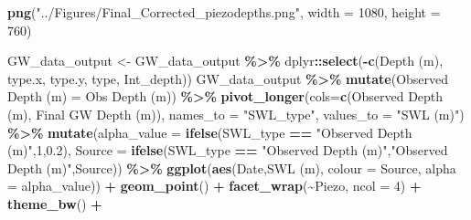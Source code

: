 \documentclass[
]{article}
\newenvironment{Shaded}{\begin{snugshade}}{\end{snugshade}}
\newcommand{\AttributeTok}[1]{\textcolor[rgb]{0.13,0.29,0.53}{#1}}
\newcommand{\DecValTok}[1]{\textcolor[rgb]{0.00,0.00,0.81}{#1}}
\newcommand{\FloatTok}[1]{\textcolor[rgb]{0.00,0.00,0.81}{#1}}
\newcommand{\FunctionTok}[1]{\textcolor[rgb]{0.13,0.29,0.53}{\textbf{#1}}}
\newcommand{\NormalTok}[1]{#1}
\newcommand{\OtherTok}[1]{\textcolor[rgb]{0.56,0.35,0.01}{#1}}
\newcommand{\SpecialCharTok}[1]{\textcolor[rgb]{0.81,0.36,0.00}{\textbf{#1}}}
\newcommand{\StringTok}[1]{\textcolor[rgb]{0.31,0.60,0.02}{#1}}
\begin{document}
\begin{Shaded}
\begin{Highlighting}[]
\FunctionTok{png}\NormalTok{(}\StringTok{"../Figures/Final\_Corrected\_piezodepths.png"}\NormalTok{, }\AttributeTok{width =} \DecValTok{1080}\NormalTok{, }\AttributeTok{height =} \DecValTok{760}\NormalTok{)}

\NormalTok{GW\_data\_output }\OtherTok{\textless{}{-}}\NormalTok{ GW\_data\_output }\SpecialCharTok{\%\textgreater{}\%}
\NormalTok{  dplyr}\SpecialCharTok{::}\FunctionTok{select}\NormalTok{(}\SpecialCharTok{{-}}\FunctionTok{c}\NormalTok{(}\StringTok{\textasciigrave{}}\AttributeTok{Depth (m)}\StringTok{\textasciigrave{}}\NormalTok{,}
\NormalTok{            type.x, type.y, type, Int\_depth))}
\NormalTok{GW\_data\_output }\SpecialCharTok{\%\textgreater{}\%}
  \FunctionTok{mutate}\NormalTok{(}\StringTok{\textasciigrave{}}\AttributeTok{Observed Depth (m)}\StringTok{\textasciigrave{}} \OtherTok{=} \StringTok{\textasciigrave{}}\AttributeTok{Obs Depth (m)}\StringTok{\textasciigrave{}}\NormalTok{) }\SpecialCharTok{\%\textgreater{}\%}
  \FunctionTok{pivot\_longer}\NormalTok{(}\AttributeTok{cols=}\FunctionTok{c}\NormalTok{(}\StringTok{\textasciigrave{}}\AttributeTok{Observed Depth (m)}\StringTok{\textasciigrave{}}\NormalTok{, }\StringTok{\textasciigrave{}}\AttributeTok{Final GW Depth (m)}\StringTok{\textasciigrave{}}\NormalTok{), }
               \AttributeTok{names\_to =} \StringTok{"SWL\_type"}\NormalTok{, }\AttributeTok{values\_to =} \StringTok{"SWL (m)"}\NormalTok{) }\SpecialCharTok{\%\textgreater{}\%} 
  \FunctionTok{mutate}\NormalTok{(}\AttributeTok{alpha\_value =} \FunctionTok{ifelse}\NormalTok{(SWL\_type }\SpecialCharTok{==} \StringTok{"Observed Depth (m)"}\NormalTok{,}\DecValTok{1}\NormalTok{,}\FloatTok{0.2}\NormalTok{),}
         \AttributeTok{Source =} \FunctionTok{ifelse}\NormalTok{(SWL\_type }\SpecialCharTok{==} \StringTok{"Observed Depth (m)"}\NormalTok{,}\StringTok{"Observed Depth (m)"}\NormalTok{,Source)) }\SpecialCharTok{\%\textgreater{}\%}
  \FunctionTok{ggplot}\NormalTok{(}\FunctionTok{aes}\NormalTok{(Date,}\StringTok{\textasciigrave{}}\AttributeTok{SWL (m)}\StringTok{\textasciigrave{}}\NormalTok{, }\AttributeTok{colour =}\NormalTok{ Source, }\AttributeTok{alpha =}\NormalTok{ alpha\_value)) }\SpecialCharTok{+} 
  \FunctionTok{geom\_point}\NormalTok{() }\SpecialCharTok{+} 
  \FunctionTok{facet\_wrap}\NormalTok{(}\SpecialCharTok{\textasciitilde{}}\NormalTok{Piezo, }\AttributeTok{ncol =} \DecValTok{4}\NormalTok{) }\SpecialCharTok{+} \FunctionTok{theme\_bw}\NormalTok{() }\SpecialCharTok{+} 

\end{Highlighting}
\end{Shaded}
\end{document}
